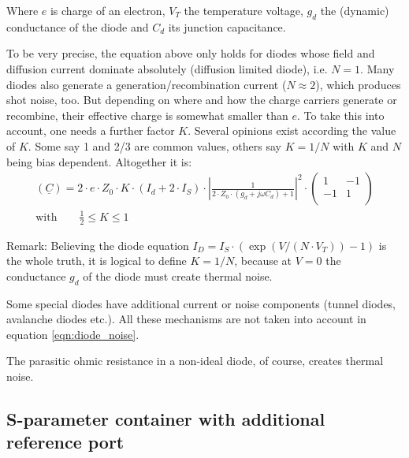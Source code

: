\documentclass[10pt]{report}
\begin{document}
Where $e$ is charge of an electron, $V_T$ the temperature voltage,
$g_d$ the (dynamic) conductance of the diode and $C_d$ its junction
capacitance.

\addvspace{12pt}

To be very precise, the equation above only holds for diodes whose
field and diffusion current dominate absolutely (diffusion limited
diode), i.e. $N=1$.  Many diodes also generate a
generation/recombination current ($N\approx 2$), which produces shot
noise, too.  But depending on where and how the charge carriers
generate or recombine, their effective charge is somewhat smaller than
$e$.  To take this into account, one needs a further factor $K$.
Several opinions exist according the value of $K$.  Some say 1 and 2/3
are common values, others say $K=1/N$ with $K$ and $N$ being bias
dependent.  Altogether it is:
\begin{equation}
\begin{split}
(\underline{C})
 = 2\cdot e\cdot Z_0\cdot K\cdot \left(I_{d} + 2\cdot I_{S}\right)\cdot
    \left| \frac{1}{2\cdot Z_0\cdot (g_d+j\omega C_d) + 1}\right|^2 \cdot
\begin{pmatrix}
   1 & -1\\
  -1 &  1\\
\end{pmatrix}\\
\text{with}\qquad\frac{1}{2}\le K \le 1
\end{split}
\label{eqn:diode_noise}
\end{equation}

Remark: Believing the diode equation $I_D = I_S\cdot (\exp(V/(N\cdot
V_T)) - 1)$ is the whole truth, it is logical to define $K=1/N$,
because at $V=0$ the conductance $g_d$ of the diode must create
thermal noise.

\addvspace{12pt}

Some special diodes have additional current or noise components
(tunnel diodes, avalanche diodes etc.).  All these mechanisms are not
taken into account in equation \eqref{eqn:diode_noise}.

\addvspace{12pt}

The parasitic ohmic resistance in a non-ideal diode, of course,
creates thermal noise.

\subsection{S-parameter container with additional reference port}
\end{document}
